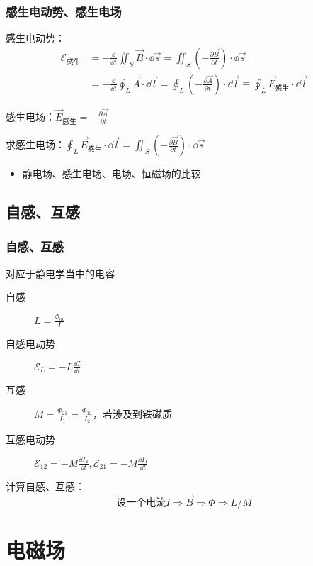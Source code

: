 \documentclass{ctexbeamer}
\begin{document}
\begin{frame}[c]
    \frametitle{感生电动势、感生电场}

    感生电动势：
    $$\begin{aligned}
            \mathcal{E}_{\text{感生}} & =-\frac{\dd}{\dd t}\iint_S\vec{B}\cdot\dd\vec{s}=\iint_S(-\frac{\partial\vec{B}}{\partial t})\cdot\dd\vec{s}                                                \\
                                    & =-\frac{\dd}{\dd t}\oint_L\vec{A}\cdot\dd\vec{l}=\oint_L(-\frac{\partial\vec{A}}{\partial t})\cdot\dd\vec{l}\equiv\oint_L\vec{E}_{\text{感生}}\cdot\dd\vec{l}
        \end{aligned}$$

    感生电场：$\vec{E}_{\text{感生}}=-\frac{\partial \vec{A}}{\partial t}$

    求感生电场：$\oint_L\vec{E}_{\text{感生}}\cdot\dd\vec{l}=\iint_S(-\frac{\partial\vec{B}}{\partial t})\cdot\dd\vec{s}$

    \begin{itemize}
        \item 静电场、感生电场、电场、恒磁场的比较
    \end{itemize}
\end{frame}

\subsection{自感、互感}

\begin{frame}[c]
    \frametitle{自感、互感}

    对应于静电学当中的电容

    \begin{description}
        \item[自感] $L=\frac{\Phi_m}{I}$
        \item[自感电动势] $\mathcal{E}_L=-L\frac{\dd I}{\dd t}$
        \item[互感] $M=\frac{\Phi_{21}}{I_1}=\frac{\Phi_{12}}{I_2}$，若涉及到铁磁质
        \item[互感电动势] $\mathcal{E}_{12}=-M\frac{\dd I_2}{\dd t}, \mathcal{E}_{21}=-M\frac{\dd I_1}{\dd t}$
    \end{description}
    计算自感、互感：
    $$\text{设一个电流}I\Rightarrow\vec{B}\Rightarrow\Phi\Rightarrow L/M$$
\end{frame}

\section{电磁场}
\end{document}
